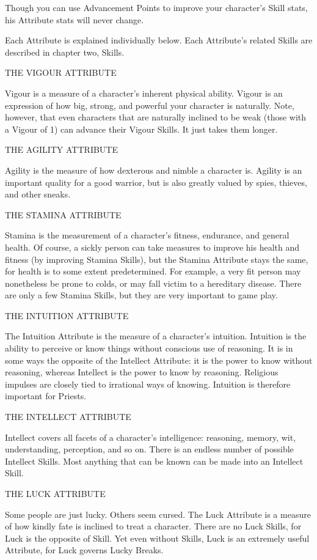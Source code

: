 \documentclass[11pt,twocolumn]{book}
\begin{document}
Though you can use Advancement Points to improve your character’s Skill stats, his Attribute stats will never change.

Each Attribute is explained individually below. Each Attribute’s related Skills are described in chapter two, Skills.

THE VIGOUR ATTRIBUTE

Vigour is a measure of a character’s inherent physical ability. Vigour is an expression of how big, strong, and powerful your character is naturally. Note, however, that even characters that are naturally inclined to be weak (those with a Vigour of 1) can advance their Vigour Skills. It just takes them longer.

THE AGILITY ATTRIBUTE

Agility is the measure of how dexterous and nimble a character is. Agility is an important quality for a good warrior, but is also greatly valued by spies, thieves, and other sneaks.

THE STAMINA ATTRIBUTE

Stamina is the measurement of a character’s fitness, endurance, and general health. Of course, a sickly person can take measures to improve his health and fitness (by improving Stamina Skills), but the Stamina Attribute stays the same, for health is to some extent predetermined. For example, a very fit person may nonetheless be prone to colds, or may fall victim to a hereditary disease. There are only a few Stamina Skills, but they are very important to game play.

THE INTUITION ATTRIBUTE

The Intuition Attribute is the measure of a character’s intuition. Intuition is the ability to perceive or know things without conscious use of reasoning. It is in some ways the opposite of the Intellect Attribute: it is the power to know without reasoning, whereas Intellect is the power to know by reasoning. Religious impulses are closely tied to irrational ways of knowing. Intuition is therefore important for Priests.

THE INTELLECT ATTRIBUTE

Intellect covers all facets of a character’s intelligence: reasoning, memory, wit, understanding, perception, and so on. There is an endless number of possible Intellect Skills. Most anything that can be known can be made into an Intellect Skill.

THE LUCK ATTRIBUTE

Some people are just lucky. Others seem cursed. The Luck Attribute is a measure of how kindly fate is inclined to treat a character. There are no Luck Skills, for Luck is the opposite of Skill. Yet even without Skills, Luck is an extremely useful Attribute, for Luck governs Lucky Breaks.
\end{document}
